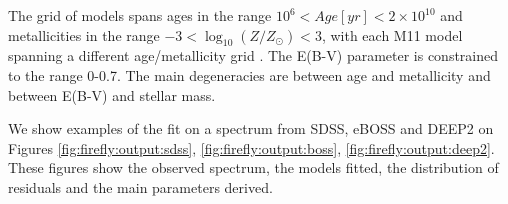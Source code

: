 \documentclass[onecolumn]{aa}
\begin{document}
The grid of models spans ages in the range $10^{6}<Age [yr]< 2 \times 10^{10}$ and metallicities in the range $-3<\log_{10}(Z/Z_\odot)<3$, with each M11 model spanning a different age/metallicity grid \citep[cfr.][Table1]{firefly2017MNRAS}. 
The E(B-V) parameter is constrained to the range 0-0.7. 
The main degeneracies are between age and metallicity and between E(B-V) and stellar mass.

We show examples of the fit on a spectrum from SDSS, eBOSS and DEEP2 on Figures \ref{fig:firefly:output:sdss}, \ref{fig:firefly:output:boss}, \ref{fig:firefly:output:deep2}.
These figures show the observed spectrum, the models fitted, the distribution of residuals and the main parameters derived.
\end{document}
